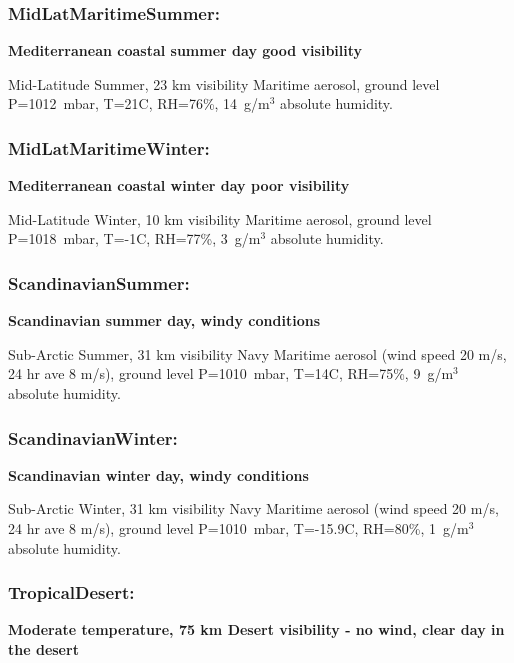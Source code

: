 \documentclass{workpackage}
\begin{document}
\subsubsection{MidLatMaritimeSummer:}
\label{sec:MidLatMaritimeSummer}

\textbf{Mediterranean coastal summer day good visibility}

Mid-Latitude Summer, 23 km visibility  Maritime aerosol, ground level P=1012~mbar, T=21C, RH=76\%, 14~g/m$^3$ absolute humidity.

\subsubsection{MidLatMaritimeWinter:}
\label{sec:MidLatMaritimeWinter}

\textbf{Mediterranean coastal winter day poor visibility}

Mid-Latitude Winter, 10 km visibility  Maritime aerosol, ground level P=1018~mbar, T=-1C, RH=77\%, 3~g/m$^3$ absolute humidity.

\subsubsection{ScandinavianSummer:}
\label{sec:ScandinavianSummer}

\textbf{Scandinavian summer day, windy conditions}

Sub-Arctic Summer, 31 km visibility  Navy Maritime aerosol (wind speed 20 m/s, 24 hr ave 8 m/s), ground level P=1010~mbar, T=14C, RH=75\%, 9~g/m$^3$ absolute humidity.

\subsubsection{ScandinavianWinter:}
\label{sec:ScandinavianWinter}

\textbf{Scandinavian winter day, windy conditions}

Sub-Arctic Winter, 31 km visibility  Navy Maritime aerosol (wind speed 20 m/s, 24 hr ave 8 m/s), ground level P=1010~mbar, T=-15.9C, RH=80\%, 1~g/m$^3$ absolute humidity.

\subsubsection{TropicalDesert:}
\label{sec:TropicalDesert}

\textbf{Moderate temperature, 75 km Desert visibility - no wind, clear day in the desert}
\end{document}
